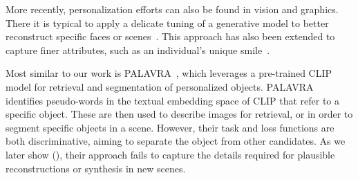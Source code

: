 More recently, personalization efforts can also be found in vision and graphics. There it is typical to apply a delicate tuning of a generative model to better reconstruct specific faces or scenes~\citep{semantic2019bau,roich2021pivotal,alaluf2021hyperstyle,dinh2022hyperinverter,cao2022authentic}. This approach has also been extended to capture finer attributes, such as an individual's unique smile~\citep{nitzan2022mystyle}.

Most similar to our work is PALAVRA~\citep{cohen2022my}, which leverages a pre-trained CLIP model for retrieval and segmentation of personalized objects. PALAVRA identifies pseudo-words in the textual embedding space of CLIP that refer to a specific object. These are then used to describe images for retrieval, or in order to segment specific objects in a scene. However, their task and loss functions are both discriminative, aiming to separate the object from other candidates. As we later show (), their approach fails to capture the details required for plausible reconstructions or synthesis in new scenes.
